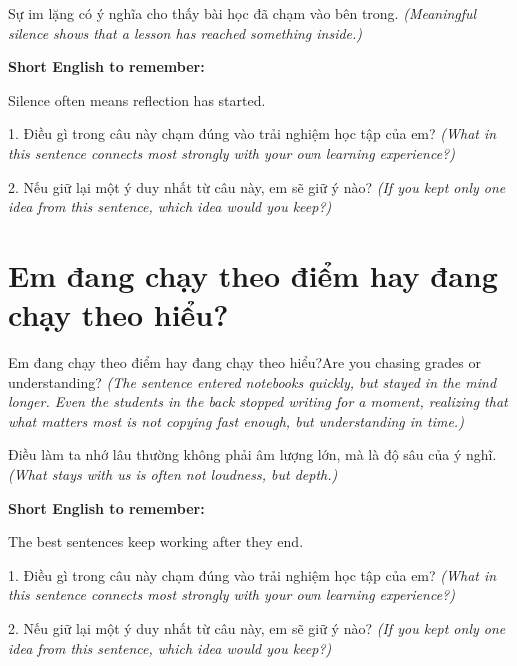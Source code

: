 \begin{baihoc}
Sự im lặng có ý nghĩa cho thấy bài học đã chạm vào bên trong.
\textit{(Meaningful silence shows that a lesson has reached something inside.)}
\end{baihoc}

\begin{ghinhoanh}
\textbf{Short English to remember:}

Silence often means reflection has started.

\end{ghinhoanh}

\begin{tuhocnhanh}
1. Điều gì trong câu này chạm đúng vào trải nghiệm học tập của em? \textit{(What in this sentence connects most strongly with your own learning experience?)}

2. Nếu giữ lại một ý duy nhất từ câu này, em sẽ giữ ý nào? \textit{(If you kept only one idea from this sentence, which idea would you keep?)}
\end{tuhocnhanh}
\ngancach


\section{Em đang chạy theo điểm hay đang chạy theo hiểu?}
\begin{truyen}{Em đang chạy theo điểm hay đang chạy theo hiểu?}{Are you chasing grades or understanding?}
\textit{(The sentence entered notebooks quickly, but stayed in the mind longer. Even the students in the back stopped writing for a moment, realizing that what matters most is not copying fast enough, but understanding in time.)}
\end{truyen}

\begin{baihoc}
Điều làm ta nhớ lâu thường không phải âm lượng lớn, mà là độ sâu của ý nghĩ.
\textit{(What stays with us is often not loudness, but depth.)}
\end{baihoc}

\begin{ghinhoanh}
\textbf{Short English to remember:}

The best sentences keep working after they end.

\end{ghinhoanh}

\begin{tuhocnhanh}
1. Điều gì trong câu này chạm đúng vào trải nghiệm học tập của em? \textit{(What in this sentence connects most strongly with your own learning experience?)}

2. Nếu giữ lại một ý duy nhất từ câu này, em sẽ giữ ý nào? \textit{(If you kept only one idea from this sentence, which idea would you keep?)}
\end{tuhocnhanh}
\ngancach


